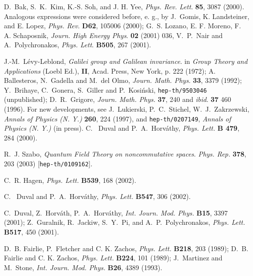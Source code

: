 \documentclass[a4paper,11pt]{article}
\begin{document}
\begin{thebibliography}{99}
D.~Bak, S.~K.~Kim, K.-S. Soh, and J. H. Yee,
{\sl Phys. Rev. Lett}. {\bf 85}, 3087 (2000).
Analogous expressions were considered before, e. g., by
J.~Gomis, K. Landsteiner, and E. Lopez,
{\sl Phys. Rev.} {\bf D62}, 105006 (2000);
G.~S. Lozano, E. F. Moreno, F. A. Schaposnik,
{\sl Journ. High Energy Phys}. {\bf 02} (2001) 036,
V.~P.~Nair and A.~Polychronakos,
{\sl Phys. Lett}. {\bf B505}, 267 (2001).

J.-M.~L\'evy-Leblond,
{\it Galilei group and Galilean invariance}.
in {\it Group Theory and Applications} (Loebl Ed.),
{\bf II}, Acad. Press, New York, p. 222 (1972);
A. Ballesteros, N.~Gadella and M.~del Olmo,
{\sl Journ. Math. Phys.} {\bf 33}, 3379 (1992);
Y.~Brihaye, C.~Gonera, S.~Giller and P.~Kosi\'nski,
\texttt{hep-th/9503046} (unpublished);
D.~R.~Grigore, {\sl Journ. Math. Phys.} {\bf 37}, 240 and
   {\sl ibid}. {\bf 37} 460 (1996).
For new developments, see
J.~Lukierski, P.~C.~Stichel, W.~J.~Zakrzewski,
   {\sl Annals of Physics (N. Y.)} {\bf 260}, 224 (1997), and
   \texttt{hep-th/0207149}, {\sl Annals of Physics (N. Y.)}
   (in press).
C.~ Duval and P.~A.~Horv\'athy,
{\sl Phys. Lett.} {\bf B 479}, 284 (2000). %

R.~J. Szabo,
{\it Quantum Field Theory on noncommutative spaces}.
{\sl Phys. Rep.} {\bf 378}, 203 (2003)
[\texttt{hep-th/0109162}].

C.~R. Hagen, {\sl Phys. Lett.} {\bf B539}, 168 (2002).

C.~ Duval and P.~A.~Horv\'athy,
{\sl Phys. Lett.} {\bf B547}, 306 (2002).

C.~Duval, Z.~Horv\'ath, P.~A.~Horv\'athy,
  {\sl Int. Journ. Mod. Phys.} {\bf  B15}, 3397 (2001);
Z.~Guralnik, R.~Jackiw, S.~Y.~Pi,
and A.~P.~Polychronakos,
{\sl Phys. Lett. } {\bf B517}, 450 (2001).



D.~B. Fairlie, P.~Fletcher and C. K. Zachos,
{\sl Phys. Lett.} {\bf B218}, 203 (1989);
D.~B. Fairlie and C. K. Zachos,
{\sl Phys. Lett.} {\bf B224}, 101 (1989);
J.~Martinez and M.~Stone,
{\sl Int. Journ. Mod. Phys.} {\bf B26}, 4389 (1993).


\end{thebibliography}
\end{document}
